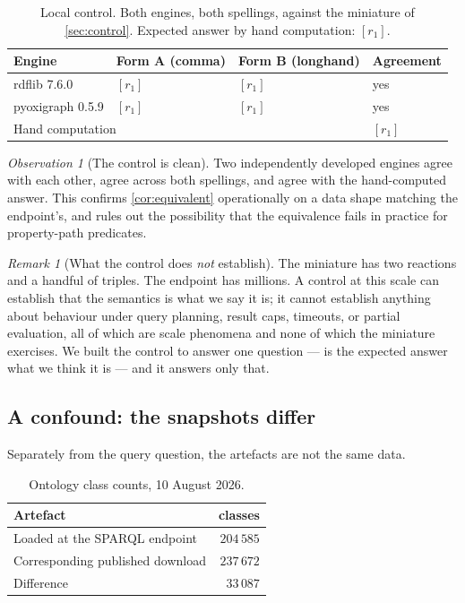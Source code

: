 \documentclass[11pt,a4paper]{article}
\theoremstyle{plain}
\theoremstyle{definition}
\theoremstyle{remark}
\newtheorem{remark}[theorem]{Remark}
\newtheorem{observation}[theorem]{Observation}
\begin{document}
\begin{table}[H]
\centering
\small
\caption{Local control. Both engines, both spellings, against the miniature of
\cref{sec:control}. Expected answer by hand computation: $[r_1]$.}
\label{tab:control}
\begin{tabular}{llll}
\toprule
Engine & Form A (comma) & Form B (longhand) & Agreement \\
\midrule
rdflib 7.6.0     & $[r_1]$ & $[r_1]$ & yes \\
pyoxigraph 0.5.9 & $[r_1]$ & $[r_1]$ & yes \\
\midrule
\multicolumn{3}{l}{Hand computation} & $[r_1]$ \\
\bottomrule
\end{tabular}
\end{table}

\begin{observation}[The control is clean]
\label{obs:control}
Two independently developed engines agree with each other, agree across both
spellings, and agree with the hand-computed answer. This confirms
\cref{cor:equivalent} operationally on a data shape matching the endpoint's,
and rules out the possibility that the equivalence fails in practice for
property-path predicates.
\end{observation}

\begin{remark}[What the control does \emph{not} establish]
\label{rem:control-limits}
The miniature has two reactions and a handful of triples. The endpoint has
millions. A control at this scale can establish that the semantics is what we
say it is; it cannot establish anything about behaviour under query planning,
result caps, timeouts, or partial evaluation, all of which are scale phenomena
and none of which the miniature exercises. We built the control to answer one
question --- is the expected answer what we think it is --- and it answers only
that.
\end{remark}

\subsection{A confound: the snapshots differ}
\label{sec:snapshot}

Separately from the query question, the artefacts are not the same data.

\begin{table}[H]
\centering
\small
\caption{Ontology class counts, 10 August 2026.}
\label{tab:snapshot}
\begin{tabular}{lr}
\toprule
Artefact & classes \\
\midrule
Loaded at the SPARQL endpoint            & $204\,585$ \\
Corresponding published download         & $237\,672$ \\
\midrule
Difference                               & $33\,087$ \\
\bottomrule
\end{tabular}
\end{table}
\end{document}
